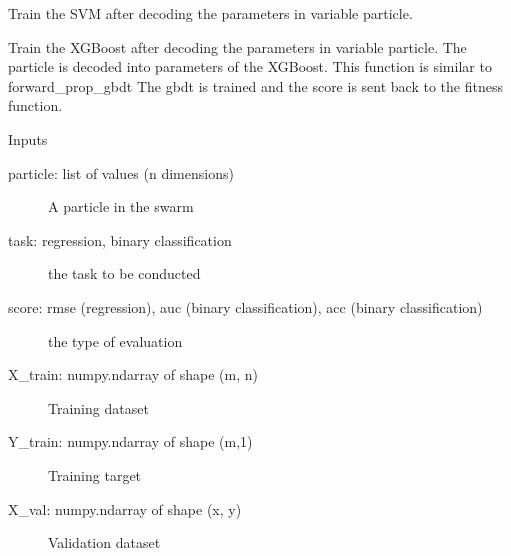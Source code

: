 \documentclass[letterpaper,10pt,english]{sphinxmanual}
\begin{document}
\begin{fulllineitems}
\begin{fulllineitems}
\end{fulllineitems}


\begin{fulllineitems}
\label{\detokenize{index:pspso.pspso.forward_prop_svm}}
Train the SVM after decoding the parameters in variable particle.

\end{fulllineitems}


\begin{fulllineitems}
\label{\detokenize{index:pspso.pspso.forward_prop_xgboost}}
Train the XGBoost after decoding the parameters in variable particle.
The particle is decoded into parameters of the XGBoost.
This function is similar to forward\_prop\_gbdt
The gbdt is trained and the score is sent back to the fitness function.

Inputs
\begin{description}
\item[{particle: list of values (n dimensions)}] \leavevmode
A particle in the swarm

\item[{task: regression, binary classification}] \leavevmode
the task to be conducted

\item[{score: rmse (regression), auc (binary classification), acc (binary classification)}] \leavevmode
the type of evaluation

\item[{X\_train: numpy.ndarray of shape (m, n)}] \leavevmode
Training dataset

\item[{Y\_train: numpy.ndarray of shape (m,1)}] \leavevmode
Training target

\item[{X\_val: numpy.ndarray of shape (x, y)}] \leavevmode
Validation dataset


\end{description}
\end{fulllineitems}
\end{fulllineitems}
\end{document}

